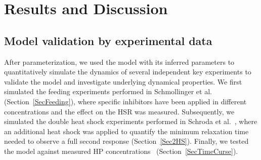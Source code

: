 \documentclass[oneside, 10pt, a4paper, twocolumn]{article}
\begin{document}





\section{Results and Discussion}

\subsection{Model validation by experimental data}
\label{SectionExperiments}

After parameterization, we used the model with its inferred parameters to quantitatively simulate the dynamics of several independent key experiments to validate the model and investigate underlying dynamical properties. 
We first  simulated the feeding experiments performed in Schmollinger et al.~\cite{Schmollinger2013} (Section~\ref{SecFeeding}),
where specific inhibitors have been applied in different concentrations and the
effect on the HSR was measured. Subsequently, we simulated the double heat shock experiments performed
in Schroda et al.~\cite{Schroda2000}, where an additional heat shock was applied 
to quantify the minimum relaxation time needed to observe a full second response (Section~\ref{Sec2HS}). Finally, we tested the model against measured HP concentrations~\cite{Muehlhaus2011} (Section~\ref{SecTimeCurse}).

\end{document}

